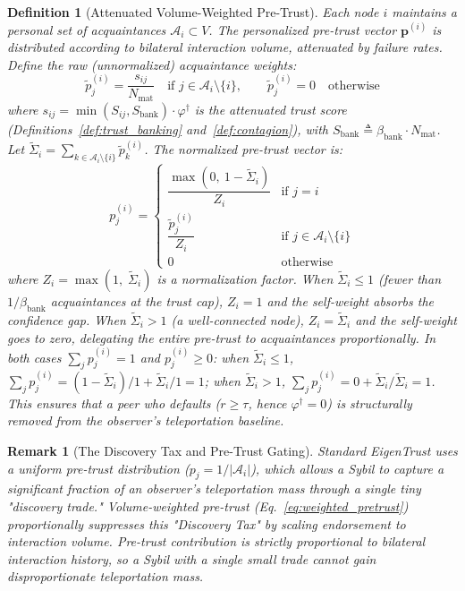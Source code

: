 \documentclass[11pt]{article}
\newtheorem{definition}[theorem]{Definition}
\newtheorem{remark}[theorem]{Remark}
\begin{document}
\begin{definition}[Attenuated Volume-Weighted Pre-Trust]\label{def:pretrust}
Each node $i$ maintains a personal set of \emph{acquaintances} $\mathcal{A}_i \subset V$. The personalized pre-trust vector $\mathbf{p}^{(i)}$ is distributed according to bilateral interaction volume, attenuated by failure rates. Define the raw (unnormalized) acquaintance weights:
\begin{equation}\label{eq:weighted_pretrust_raw}
    \tilde{p}^{(i)}_j = \frac{s_{ij}}{N_{\text{mat}}} \quad \text{if } j \in \mathcal{A}_i \setminus \{i\}, \qquad \tilde{p}^{(i)}_j = 0 \quad \text{otherwise}
\end{equation}
where $s_{ij} = \min(S_{ij}, S_{\text{bank}}) \cdot \varphi^{\dagger}$ is the attenuated trust score (Definitions~\ref{def:trust_banking} and~\ref{def:contagion}), with $S_{\text{bank}} \triangleq \beta_{\text{bank}} \cdot N_{\text{mat}}$. Let $\tilde{\Sigma}_i = \sum_{k \in \mathcal{A}_i \setminus \{i\}} \tilde{p}^{(i)}_k$. The normalized pre-trust vector is:
\begin{equation}\label{eq:weighted_pretrust}
    p^{(i)}_j = \begin{cases}
        \dfrac{\max\!\left(0,\ 1 - \tilde{\Sigma}_i\right)}{Z_i} & \text{if } j = i \\[15pt]
        \dfrac{\tilde{p}^{(i)}_j}{Z_i} & \text{if } j \in \mathcal{A}_i \setminus \{i\} \\[10pt]
        0 & \text{otherwise}
    \end{cases}
\end{equation}
where $Z_i = \max(1,\; \tilde{\Sigma}_i)$ is a normalization factor. When $\tilde{\Sigma}_i \leq 1$ (fewer than $1/\beta_{\text{bank}}$ acquaintances at the trust cap), $Z_i = 1$ and the self-weight absorbs the confidence gap. When $\tilde{\Sigma}_i > 1$ (a well-connected node), $Z_i = \tilde{\Sigma}_i$ and the self-weight goes to zero, delegating the entire pre-trust to acquaintances proportionally. In both cases $\sum_j p^{(i)}_j = 1$ and $p^{(i)}_j \geq 0$: when $\tilde{\Sigma}_i \leq 1$, $\sum_j p^{(i)}_j = (1 - \tilde{\Sigma}_i)/1 + \tilde{\Sigma}_i/1 = 1$; when $\tilde{\Sigma}_i > 1$, $\sum_j p^{(i)}_j = 0 + \tilde{\Sigma}_i / \tilde{\Sigma}_i = 1$. This ensures that a peer who defaults ($r \ge \tau$, hence $\varphi^{\dagger} = 0$) is structurally removed from the observer's teleportation baseline.
\end{definition}

\begin{remark}[The Discovery Tax and Pre-Trust Gating]
Standard EigenTrust uses a uniform pre-trust distribution ($p_j = 1/|\mathcal{A}_i|$), which allows a Sybil to capture a significant fraction of an observer's teleportation mass through a single tiny "discovery trade." Volume-weighted pre-trust (Eq.~\eqref{eq:weighted_pretrust}) proportionally suppresses this "Discovery Tax" by scaling endorsement to interaction volume. Pre-trust contribution is strictly proportional to bilateral interaction history, so a Sybil with a single small trade cannot gain disproportionate teleportation mass.
\end{remark}
\end{document}
